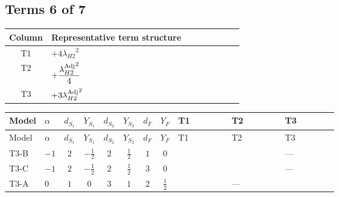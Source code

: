 \documentclass[8pt]{article}
\begin{document}
\begin{landscape}
\subsection*{Terms 6 of 7}
\begin{center}
\begin{tabular}{@{}c >{\raggedright\arraybackslash}p{0.82\linewidth}@{}}
\toprule
Column & Representative term structure \\
\midrule
T1 & \(\displaystyle +4 {\lambda_{H2}}^2\) \\
\midrule
T2 & \(\displaystyle +\frac{{\lambda_{H2}^{\rm Adj}}^2}{4}\) \\
\midrule
T3 & \(\displaystyle +3 {\lambda_{H2}^{\rm Adj}}^2\) \\
\midrule
\bottomrule
\end{tabular}
\end{center}
\smallskip
\tiny
\begin{longtable}{@{}llcccccc >{\raggedright\arraybackslash}p{0.21\linewidth} >{\raggedright\arraybackslash}p{0.21\linewidth} >{\raggedright\arraybackslash}p{0.21\linewidth}@{}}
\toprule
Model & $\alpha$ & $d_{S_1}$ & $Y_{S_1}$ & $d_{S_2}$ & $Y_{S_2}$ & $d_F$ & $Y_F$ & T1 & T2 & T3 \\
\midrule
\endfirsthead
\toprule
Model & $\alpha$ & $d_{S_1}$ & $Y_{S_1}$ & $d_{S_2}$ & $Y_{S_2}$ & $d_F$ & $Y_F$ & T1 & T2 & T3 \\
\midrule
\endhead
T3-B & $-1$ & $2$ & $-\frac{1}{2}$ & $2$ & $\frac{1}{2}$ & $1$ & $0$ & \scriptsize\adjustbox{max width=\linewidth}{$\begin{gathered} +4 {\lambda_{H2}}^2\end{gathered}$} & \scriptsize\adjustbox{max width=\linewidth}{$\begin{gathered} +\frac{{\lambda_{H2}^{\rm Adj}}^2}{4}\end{gathered}$} & --- \\
\midrule
T3-C & $-1$ & $2$ & $-\frac{1}{2}$ & $2$ & $\frac{1}{2}$ & $3$ & $0$ & \scriptsize\adjustbox{max width=\linewidth}{$\begin{gathered} +4 {\lambda_{H2}}^2\end{gathered}$} & \scriptsize\adjustbox{max width=\linewidth}{$\begin{gathered} +\frac{{\lambda_{H2}^{\rm Adj}}^2}{4}\end{gathered}$} & --- \\
\midrule
T3-A & $0$ & $1$ & $0$ & $3$ & $1$ & $2$ & $\frac{1}{2}$ & \scriptsize\adjustbox{max width=\linewidth}{$\begin{gathered} +6 {\lambda_{H2}}^2\end{gathered}$} & --- & \scriptsize\adjustbox{max width=\linewidth}{$\begin{gathered} +3 {\lambda_{H2}^{\rm Adj}}^2\end{gathered}$} \\

\end{longtable}
\end{landscape}
\end{document}
